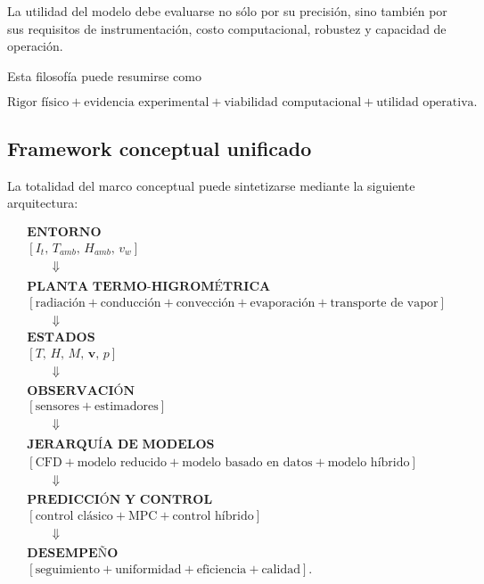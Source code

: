 La utilidad del modelo debe evaluarse no sólo por su precisión, sino también por sus requisitos de instrumentación, costo computacional, robustez y capacidad de operación.

Esta filosofía puede resumirse como

\begin{equation}
\boxed{
\text{Rigor físico}
+
\text{evidencia experimental}
+
\text{viabilidad computacional}
+
\text{utilidad operativa}.
}
\label{eq:filosofia_general}
\end{equation}

\subsection{Framework conceptual unificado}
\label{subsec:framework_unificado}

La totalidad del marco conceptual puede sintetizarse mediante la siguiente arquitectura:

\begin{equation}
\boxed{
\begin{aligned}
&\textbf{ENTORNO}
\\
&\left[
I_t,\,
T_{amb},\,
H_{amb},\,
v_w
\right]
\\[0.15cm]
&\qquad\Downarrow
\\[0.15cm]
&\textbf{PLANTA TERMO-HIGROMÉTRICA}
\\
&\left[
\text{radiación}
+
\text{conducción}
+
\text{convección}
+
\text{evaporación}
+
\text{transporte de vapor}
\right]
\\[0.15cm]
&\qquad\Downarrow
\\[0.15cm]
&\textbf{ESTADOS}
\\
&\left[
T,\,
H,\,
M,\,
\mathbf{v},\,
p
\right]
\\[0.15cm]
&\qquad\Downarrow
\\[0.15cm]
&\textbf{OBSERVACIÓN}
\\
&\left[
\text{sensores}
+
\text{estimadores}
\right]
\\[0.15cm]
&\qquad\Downarrow
\\[0.15cm]
&\textbf{JERARQUÍA DE MODELOS}
\\
&\left[
\text{CFD}
+
\text{modelo reducido}
+
\text{modelo basado en datos}
+
\text{modelo híbrido}
\right]
\\[0.15cm]
&\qquad\Downarrow
\\[0.15cm]
&\textbf{PREDICCIÓN Y CONTROL}
\\
&\left[
\text{control clásico}
+
\text{MPC}
+
\text{control híbrido}
\right]
\\[0.15cm]
&\qquad\Downarrow
\\[0.15cm]
&\textbf{DESEMPEÑO}
\\
&\left[
\text{seguimiento}
+
\text{uniformidad}
+
\text{eficiencia}
+
\text{calidad}
\right].
\end{aligned}
}
\label{eq:framework_conceptual_unificado}
\end{equation}

